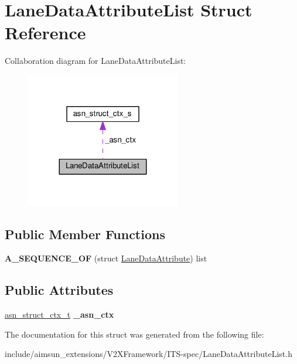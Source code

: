 \hypertarget{structLaneDataAttributeList}{}\section{Lane\+Data\+Attribute\+List Struct Reference}
\label{structLaneDataAttributeList}


Collaboration diagram for Lane\+Data\+Attribute\+List\+:\nopagebreak
\begin{figure}[H]
\begin{center}
\leavevmode
\includegraphics[width=191pt]{structLaneDataAttributeList__coll__graph}
\end{center}
\end{figure}
\subsection*{Public Member Functions}
\begin{DoxyCompactItemize}
\item 
{\bfseries A\+\_\+\+S\+E\+Q\+U\+E\+N\+C\+E\+\_\+\+OF} (struct \hyperlink{structLaneDataAttribute}{Lane\+Data\+Attribute}) list\hypertarget{structLaneDataAttributeList_a05a9b2816fec4c09f89be3f0406691eb}{}\label{structLaneDataAttributeList_a05a9b2816fec4c09f89be3f0406691eb}

\end{DoxyCompactItemize}
\subsection*{Public Attributes}
\begin{DoxyCompactItemize}
\item 
\hyperlink{structasn__struct__ctx__s}{asn\+\_\+struct\+\_\+ctx\+\_\+t} {\bfseries \+\_\+asn\+\_\+ctx}\hypertarget{structLaneDataAttributeList_a844ec50b9bbd55fac94f9be02766d849}{}\label{structLaneDataAttributeList_a844ec50b9bbd55fac94f9be02766d849}

\end{DoxyCompactItemize}


The documentation for this struct was generated from the following file\+:\begin{DoxyCompactItemize}
\item 
include/aimsun\+\_\+extensions/\+V2\+X\+Framework/\+I\+T\+S-\/spec/Lane\+Data\+Attribute\+List.\+h\end{DoxyCompactItemize}
